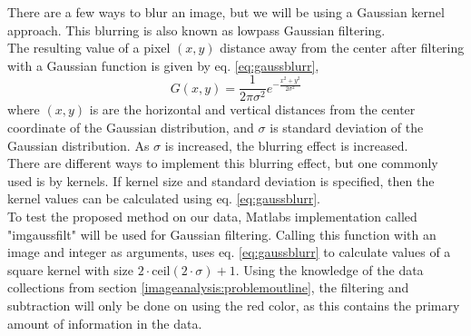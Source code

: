 There are a few ways to blur an image, but we will be using a Gaussian kernel approach. This blurring is also known as lowpass Gaussian filtering. \\
The resulting value of a pixel $(x,y)$ distance away from the center after filtering with a Gaussian function is given by eq. \ref{eq:gaussblurr},
\begin{equation}
G(x, y)=\frac{1}{2 \pi \sigma^{2}} e^{-\frac{x^{2}+y^{2}}{2 \sigma^{2}}}
\label{eq:gaussblurr}
\end{equation}
where $(x,y)$ is are the horizontal and vertical distances from the center coordinate of the Gaussian distribution, and $\sigma$ is standard deviation of the Gaussian distribution. As $\sigma$ is increased, the blurring effect is increased. \\
There are different ways to implement this blurring effect, but one commonly used is by kernels. If kernel size and standard deviation is specified, then the kernel values can be calculated using eq. \ref{eq:gaussblurr}. \\

To test the proposed method on our data, Matlabs implementation called "imgaussfilt" \cite{matlab_gaussfilt} will be used  for Gaussian filtering. Calling this function with an image and integer as arguments, uses eq. \ref{eq:gaussblurr} to calculate values of a square kernel with size $2\cdot \text{ceil}(2\cdot\sigma)+1$. Using the knowledge of the data collections from section \ref{imageanalysis:problemoutline}, the filtering and subtraction will only be done on using the red color, as this contains the primary amount of information in the data. \\


